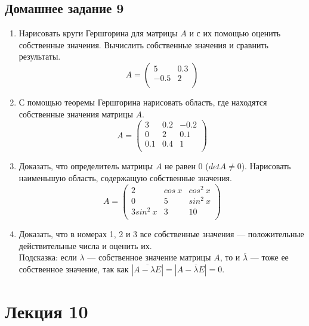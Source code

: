 \documentclass[12pt]{article}
\begin{document}
	\subsection{Домашнее задание 9}\begin{enumerate}
		\item Нарисовать круги Гершгорина для матрицы $A$ и с их помощью оценить собственные значения. Вычислить собственные значения и сравнить результаты.
		\[A = \begin{pmatrix}
		5 & 0.3\\
		-0.5 & 2\\
		\end{pmatrix}\]
		\item С помощью теоремы Гершгорина нарисовать область, где находятся собственные значения матрицы $A$.
		\[A = \begin{pmatrix}
		3 & 0.2 & -0.2\\
		0 & 2 & 0.1\\
		0.1 & 0.4 & 1\\
		\end{pmatrix}\]
		\item Доказать, что определитель матрицы $A$ не равен 0 ($detA\neq 0$). Нарисовать наименьшую область, содержащую собственные значения.
		\[A = \begin{pmatrix}
		2 & cos~x & cos^2~x\\
		0 & 5 & sin^2~x\\
		3sin^2~x & 3 & 10\\
		\end{pmatrix}\]
		\item Доказать, что в номерах 1, 2 и 3 все собственные значения --- положительные действительные числа и оценить их.\\
		Подсказка: если $\lambda$ --- собственное значение матрицы $A$, то и $\overline \lambda$ --- тоже ее собственное значение, так как $|\overline{A-\lambda E}|=|A-\overline\lambda E|=0$.
	\end{enumerate}


	\newpage
	\section{Лекция 10}
\end{document}
